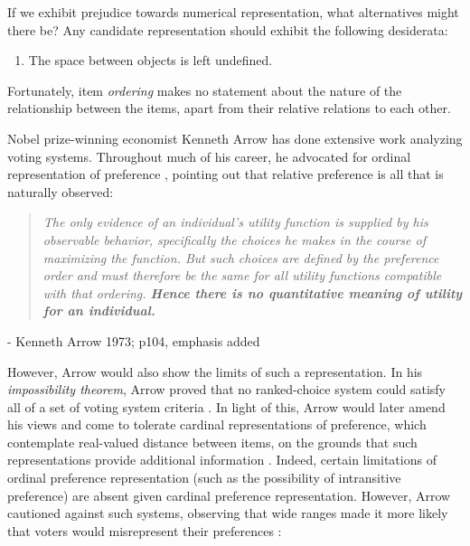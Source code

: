 \documentclass[12pt]{book}
\begin{document}
If we exhibit prejudice towards numerical representation, what alternatives might there be? Any candidate representation should exhibit the following desiderata:

\begin{enumerate}
  \item The space between objects is left undefined.
\end{enumerate}

Fortunately, item \textit{ordering} makes no statement about the nature of the relationship between the items, apart from their relative relations to each other.

\bigskip

Nobel prize-winning economist Kenneth Arrow has done extensive work analyzing voting systems.
Throughout much of his career, he advocated for ordinal representation of preference \cite{bianchi}, pointing out that relative preference is all that is naturally observed:

\begin{center}
	\begin{quotation}
\textit{
	The only evidence of an individual's utility function is supplied by his observable behavior, specifically the choices he makes in the course of maximizing the function.
	But such choices are defined by the preference order and must therefore be the same for all utility functions compatible with that ordering.
	\textbf{Hence there is no quantitative meaning of utility for an individual.}
	}
\end{quotation}
- Kenneth Arrow 1973; p104, emphasis added
\end{center}

However, Arrow would also show the limits of such a representation.
In his \textit{impossibility theorem}, Arrow proved that no ranked-choice system could satisfy all of a set of voting system criteria \cite{arrow}.
In light of this, Arrow would later amend his views and come to tolerate cardinal representations of preference, which contemplate real-valued distance between items, on the grounds that such representations provide additional information \cite{hamlin}.
Indeed, certain limitations of ordinal preference representation (such as the possibility of intransitive preference) are absent given cardinal preference representation.
However, Arrow cautioned against such systems, observing that wide ranges made it more likely that voters would misrepresent their preferences \cite{hamlin}:  
\end{document}
